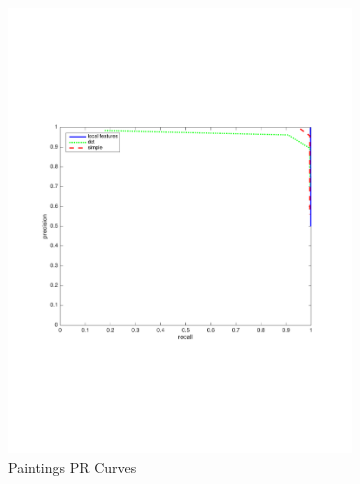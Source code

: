 \documentclass[english,12pt,a4paper,pdftex,elec,utf8, table]{aaltothesis}
\begin{document}
\begin{figure}[htb]
\begin{center}
\begin{subfigure}[b]{0.49\textwidth}
    \includegraphics[width=\textwidth]{figures/83scalePR.pdf}
    \caption{Paintings PR Curves}
    \label{83rocthinglink}
  \end{subfigure}
  \begin{subfigure}[b]{0.49\textwidth}

\end{subfigure}
\end{center}
\end{figure}
\end{document}

